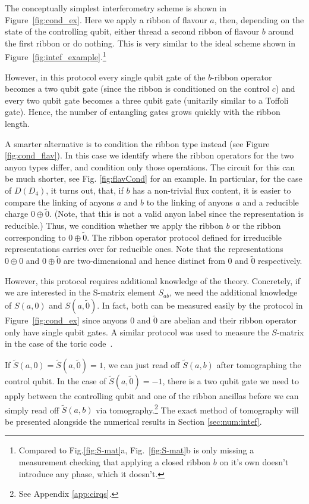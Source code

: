 \documentclass[a4paper,twocolumn,11pt, accepted=2024-06-14]{quantumarticle}
\begin{document}
The conceptually simplest interferometry scheme is shown in Figure~\ref{fig:cond_ex}. Here we apply a ribbon of flavour $a$, then, depending on the state of the controlling qubit, either thread a second ribbon of flavour $b$ around the first ribbon or do nothing. This is very similar to the ideal scheme shown in Figure~\ref{fig:intef_example}.\footnote{Compared to Fig.\ref{fig:S-mat}a, Fig.~\ref{fig:S-mat}b is only missing a measurement checking that applying a closed ribbon $b$ on it's own doesn't introduce any phase, which it doesn't.}

However, in this protocol every single qubit gate of the $b$-ribbon operator becomes a two qubit gate (since the ribbon is conditioned on the control $c$) and every two qubit gate becomes a three qubit gate (unitarily similar to a Toffoli gate). Hence, the number of entangling gates grows quickly with the ribbon length.

A smarter alternative is to condition the ribbon type instead (see Figure \ref{fig:cond_flav}). In this case we identify where the ribbon operators for the two anyon types differ, and condition only those operations. The circuit for this can be much shorter, see Fig. \ref{fig:flavCond} for an example. In particular, for the case of $D(D_4)$, it turns out, that, if $b$ has a non-trivial flux content, it is easier to compare the linking of anyons $a$ and $b$ to the linking of anyons $a$ and a reducible charge $0 \oplus \tilde 0$. (Note, that this is not a valid anyon label since the representation is reducible.) Thus, we condition whether we apply the ribbon $b$ or the ribbon corresponding to $0 \oplus \tilde 0$. The ribbon operator protocol defined for irreducible representations carries over for reducible ones. Note that the representations $0\oplus 0$ and $0 \oplus \tilde 0$ are two-dimensional and hence distinct from $0$ and $\tilde 0$ respectively.

However, this protocol requires additional knowledge of the theory. Concretely, if we are interested in the S-matrix element $S_{ab}$, we need the additional knowledge of  $S(a, 0)$ and $S(a, \tilde{0})$.
In fact, both can be measured easily by the protocol in Figure~\ref{fig:cond_ex} since anyons $0$ and $\tilde{0}$ are abelian and their ribbon operator only have single qubit gates. A similar protocol was used to measure the $S$-matrix in the case of the toric code~\cite{Satzinger_2021}.

If $\tilde S(a, 0) = \tilde S(a, \tilde{0}) = 1$, we can just read off $\tilde S(a,b)$ after tomographing the control qubit.
In the case of $\tilde S(a, \tilde{0}) = -1$, there is a two qubit gate we need to apply between the controlling qubit and one of the ribbon ancillas before we can simply read off $\tilde S(a,b)$ via tomography.\footnote{See Appendix \ref{app:cirqs}.}
The exact method of tomography will be presented alongside the numerical results in Section \ref{sec:num:intef}. 
\end{document}
